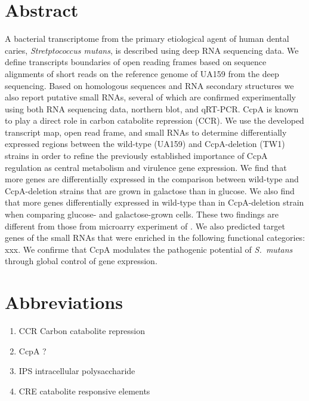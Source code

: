 \documentclass{article}
\begin{document}
\doublespacing

\section{Abstract}
A bacterial transcriptome from the primary etiological agent of human dental
caries, \textit{Stretptococcus mutans}, is described using deep RNA sequencing
data.  We define transcripts boundaries of open reading frames based on sequence
alignments of short reads on the reference genome of UA159 from the deep
sequencing.  Based on homologous sequences and RNA secondary structures we also
report putative small RNAs, several of which are confirmed experimentally using
both RNA sequencing data, northern blot, and qRT-PCR.  CcpA is known to play a
direct role in carbon catabolite repression (CCR).  We use the developed
transcript map, open read frame, and small RNAs to determine differentially
expressed regions between the wild-type (UA159) and CcpA-deletion (TW1) strains
in order to refine the previously established importance of CcpA regulation as
central metabolism and virulence gene expression.  We find that more genes are
differentially expressed in the comparison between wild-type and CcpA-deletion
strains that are grown in galactose than in glucose.  We also find that more
genes differentially expressed in wild-type than in CcpA-deletion strain when
comparing glucose- and galactose-grown cells.  These two findings are different
from those from microarry experiment of \cite{Abranches2008}.  We also predicted
target genes of the small RNAs that were enriched in the following functional
categories: xxx.  We confirme that CcpA modulates the pathogenic potential of
\textit{S.\ mutans} through global control of gene expression.

\section{Abbreviations}

\begin{enumerate}
\item CCR Carbon catabolite repression
\item CcpA ?
\item IPS intracellular polysaccharide
\item CRE catabolite responsive elements
\end{enumerate}
\end{document}
